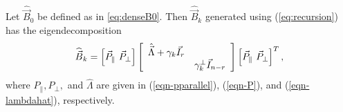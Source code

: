 \begin{theorem}\label{eqn-thm1}
Let $\widehat{\vec{B}}_0$ be defined as in \eqref{eq:denseB0}.  
Then $\widehat{\vec{B}}_k$ generated using (\ref{eq:recursion})
has the eigendecomposition
\begin{equation}\label{eq:Bkhat_eig}
	\widehat{\vec{B}}_k 
	 =
	\left[ \vec{P}_{\parallel} \,\, \vec{P}_{\perp}\right]
	\left[ 
		\begin{array}{c c}
			\hat{\vec{\Lambda}} +\gamma_k \vec{I}_r 	& 			\\
														&	\gamma^\perp_k\vec{I}_{n-r}
		\end{array}
	\right]
	\left[ \vec{P}_{\parallel} \,\,  \vec{P}_{\perp}\right]^T,
\end{equation}
where $P_\parallel, P_\perp,$ and $\hat{\Lambda}$ are given in
(\ref{eqn-pparallel}), (\ref{eqn-P}), and (\ref{eqn-lambdahat}), respectively.
\end{theorem}
